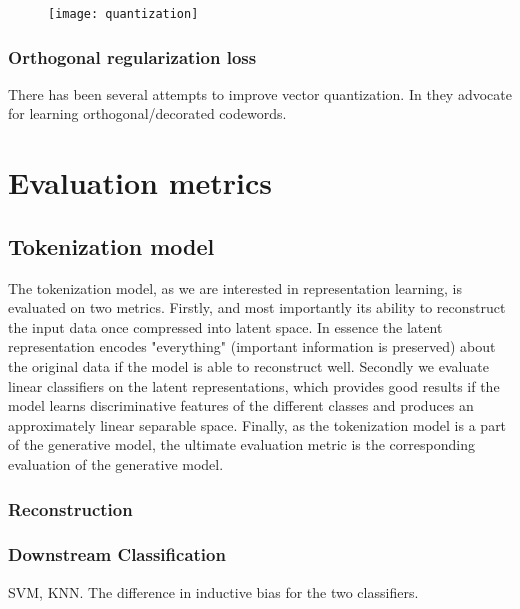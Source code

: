 \documentclass[../../thesis.tex]{subfiles}
\begin{document}
\begin{figure}[h]
    \texttt{[image: quantization]}
    \centering    
\end{figure}

\subsubsection{Orthogonal regularization loss}

There has been several attempts to improve vector quantization. In \cite{shin2023exploration} they advocate for learning orthogonal/decorated codewords. 



\section{Evaluation metrics}

\subsection{Tokenization model}

The tokenization model, as we are interested in representation learning, is evaluated on two metrics. Firstly, and most importantly its ability to reconstruct the input data once compressed into latent space. In essence the latent representation encodes "everything" (important information is preserved) about the original data if the model is able to reconstruct well. Secondly we evaluate linear classifiers on the latent representations, which provides good results if the model learns discriminative features of the different classes and produces an approximately linear separable space. Finally, as the tokenization model is a part of the generative model, the ultimate evaluation metric is the corresponding evaluation of the generative model. 

\subsubsection{Reconstruction}


\subsubsection{Downstream Classification}

SVM, KNN. The difference in inductive bias for the two classifiers. 
\end{document}
